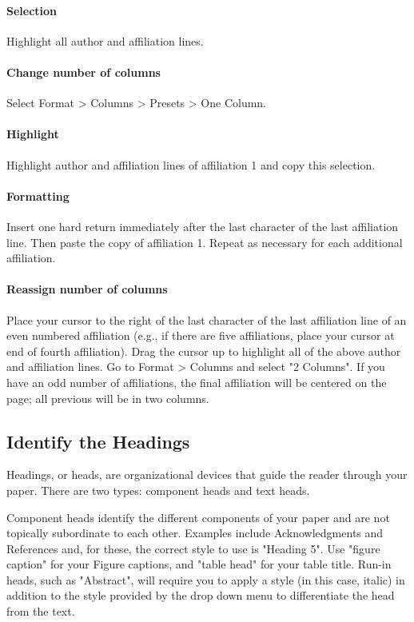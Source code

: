 \documentclass[conference]{IEEEtran}
\begin{document}
\paragraph{Selection} 
Highlight all author and affiliation lines.

\paragraph{Change number of columns} 
Select Format > Columns > Presets > One Column. 

\paragraph{Highlight} 
Highlight author and affiliation lines of affiliation 1 and copy this selection.

\paragraph{Formatting} 
Insert one hard return immediately after the last character of the last affiliation line. Then paste the copy of affiliation 1. Repeat as necessary for each additional affiliation.

\paragraph{Reassign number of columns} 
Place your cursor to the right of the last character of the last affiliation line of an even numbered affiliation (e.g., if there are five affiliations, place your cursor at end of fourth affiliation). Drag the cursor up to highlight all of the above author and affiliation lines. Go to Format >  Columns and select "2 Columns". If you have an odd number of affiliations, the final affiliation will be centered on the page; all previous will be in two columns.

\subsection{Identify the Headings} 
Headings, or heads, are organizational devices that guide the reader through your paper. There are two types: component heads and text heads.

Component heads identify the different components of your paper and are not topically subordinate to each other. Examples include Acknowledgments and References and, for these, the correct style to use is "Heading 5". Use "figure caption" for your Figure captions, and "table head" for your table title. Run-in heads, such as "Abstract", will require you to apply a style (in this case, italic) in addition to the style provided by the drop down menu to differentiate the head from the text.
\end{document}

